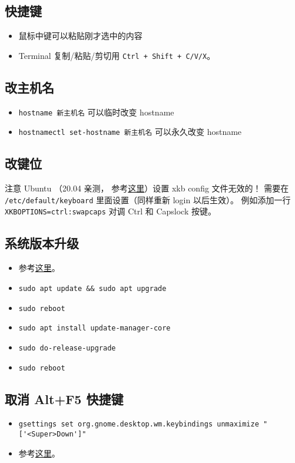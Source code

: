 
\subsection{快捷键}
\begin{itemize}
\item 鼠标中键可以粘贴刚才选中的内容
\item Terminal 复制/粘贴/剪切用 \verb`Ctrl + Shift + C/V/X`。
\end{itemize}


\subsection{改主机名}
\begin{itemize}
\item \verb`hostname 新主机名` 可以临时改变 hostname
\item \verb`hostnamectl set-hostname 新主机名` 可以永久改变 hostname
\end{itemize}


\subsection{改键位}\label{sub_Ubuntu_1}
注意 Ubuntu （20.04 亲测， 参考\href{https://manpages.ubuntu.com/manpages/focal/en/man5/keyboard.5.html}{这里}）设置 xkb config 文件无效的！ 需要在 \verb`/etc/default/keyboard` 里面设置（同样重新 login 以后生效）。 例如添加一行 \verb`XKBOPTIONS=ctrl:swapcaps` 对调 Ctrl 和 Capslock 按键。

\subsection{系统版本升级}
\begin{itemize}
\item 参考\href{https://www.cyberciti.biz/faq/upgrade-ubuntu-18-04-to-20-04-lts-using-command-line/#Make_a_backup}{这里}。
\item \verb`sudo apt update && sudo apt upgrade`
\item \verb`sudo reboot`
\item \verb`sudo apt install update-manager-core`
\item \verb`sudo do-release-upgrade`
\item \verb`sudo reboot`
\end{itemize}

\subsection{取消 Alt+F5 快捷键}
\begin{itemize}
\item \verb`gsettings set org.gnome.desktop.wm.keybindings unmaximize "['<Super>Down']"`
\item 参考\href{https://askubuntu.com/questions/1322105/cant-find-alt-f5-in-settings-keyboard-shortcuts}{这里}。
\end{itemize}


